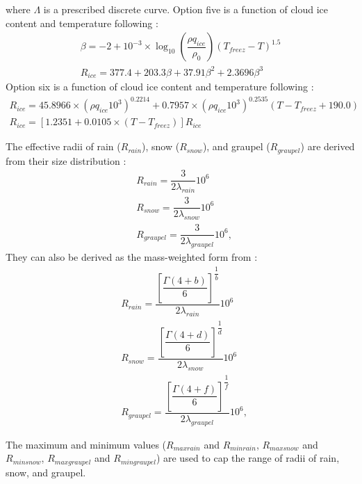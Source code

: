 \documentclass[letterpaper,titlepage,10pt]{article}
\numberwithin{equation}{section}
\begin{document}
where $\Lambda$ is a prescribed discrete curve. Option five is a function of cloud ice content and temperature following \citet{wyser1998thee}:
\begin{gather}
	\beta = - 2 + 10^{-3} \times \log_{10} \left(\dfrac{\rho q_{ice}}{\rho_0} \right) \left(T_{freez} - T \right)^{1.5} \\
	R_{ice} = 377.4 + 203.3 \beta + 37.91 \beta^2 + 2.3696 \beta^3
\end{gather}
Option six is a function of cloud ice content and temperature following \citet{sun1999para, sun2001repl}:
\begin{gather}
	R_{ice} = 45.8966 \times \left(\rho q_{ice} 10^3 \right)^{0.2214} + 0.7957 \times \left(\rho q_{ice} 10^3 \right)^{0.2535} \left(T - T_{freez} + 190.0 \right) \\
	R_{ice} = \left[1.2351 + 0.0105 \times \left(T - T_{freez} \right) \right] R_{ice}
\end{gather}

The effective radii of rain ($R_{rain}$), snow ($R_{snow}$), and graupel ($R_{graupel}$) are derived from their size distribution \citet{lin1983bulk}:
\begin{align}
	& R_{rain} = \dfrac{3}{2 \lambda_{rain}} 10^6 \\
	& R_{snow} = \dfrac{3}{2 \lambda_{snow}} 10^6 \\
	& R_{graupel} = \dfrac{3}{2 \lambda_{graupel}} 10^6,
\end{align}
They can also be derived as the mass-weighted form from \citet{lin1983bulk}:
\begin{align}
	& R_{rain} = \dfrac{\left[\dfrac{\Gamma\left(4+b\right)}{6}\right]^{\dfrac{1}{b}}}{2 \lambda_{rain}} 10^6 \\
	& R_{snow} = \dfrac{\left[\dfrac{\Gamma\left(4+d\right)}{6}\right]^{\dfrac{1}{d}}}{2 \lambda_{snow}} 10^6 \\
	& R_{graupel} = \dfrac{\left[\dfrac{\Gamma\left(4+f\right)}{6}\right]^{\dfrac{1}{f}}}{2 \lambda_{graupel}} 10^6,
\end{align}

The maximum and minimum values ($R_{maxrain}$ and $R_{minrain}$, $R_{maxsnow}$ and $R_{minsnow}$, $R_{maxgraupel}$ and $R_{mingraupel}$) are used to cap the range of radii of rain, snow, and graupel.


\newpage
\end{document}
